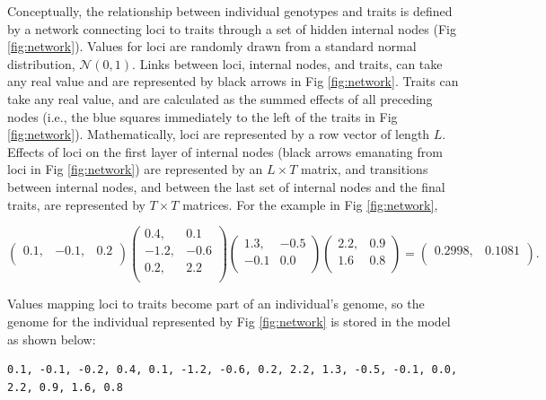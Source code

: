 \documentclass[
]{article}
\begin{document}
Conceptually, the relationship between individual genotypes and traits is defined by a network connecting loci to traits through a set of hidden internal nodes (Fig \ref{fig:network}).
Values for loci are randomly drawn from a standard normal distribution, \(\mathcal{N}\left(0, 1\right)\).
Links between loci, internal nodes, and traits, can take any real value and are represented by black arrows in Fig \ref{fig:network}.
Traits can take any real value, and are calculated as the summed effects of all preceding nodes (i.e., the blue squares immediately to the left of the traits in Fig \ref{fig:network}).
Mathematically, loci are represented by a row vector of length \(L\).
Effects of loci on the first layer of internal nodes (black arrows emanating from loci in Fig \ref{fig:network}) are represented by an \(L \times T\) matrix, and transitions between internal nodes, and between the last set of internal nodes and the final traits, are represented by \(T \times T\) matrices.
For the example in Fig \ref{fig:network},

\[
\begin{pmatrix}
  0.1, & -0.1, & 0.2 \\
\end{pmatrix} 
\begin{pmatrix}
  0.4, &  0.1 \\
 -1.2, & -0.6 \\
  0.2, &  2.2 \\
\end{pmatrix}
\begin{pmatrix}
   1.3, & -0.5 \\
  -0.1  &  0.0 \\
\end{pmatrix}
\begin{pmatrix}
   2.2, &  0.9 \\
   1.6  &  0.8 \\
\end{pmatrix} = 
\begin{pmatrix}
  0.2998, & 0.1081 \\
\end{pmatrix}.
\]

Values mapping loci to traits become part of an individual's genome, so the genome for the individual represented by Fig \ref{fig:network} is stored in the model as shown below:

\begin{verbatim}
0.1, -0.1, -0.2, 0.4, 0.1, -1.2, -0.6, 0.2, 2.2, 1.3, -0.5, -0.1, 0.0, 2.2, 0.9, 1.6, 0.8
\end{verbatim}
\end{document}
